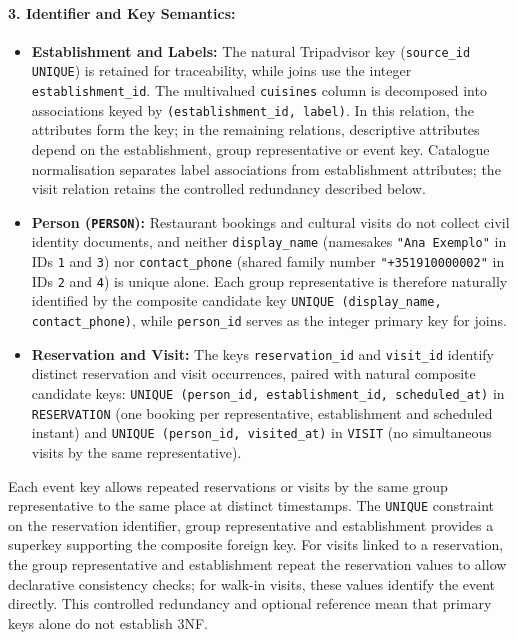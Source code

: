 \paragraph{3. Identifier and Key Semantics:}
\begin{itemize}\raggedright
\item \textbf{Establishment and Labels:} The natural Tripadvisor key (\texttt{source\_\allowbreak{}id UNIQUE}) is retained for traceability, while joins use the integer \texttt{establishment\_\allowbreak{}id}. The multivalued \texttt{cuisines} column is decomposed into associations keyed by \texttt{(\allowbreak{}establishment\_\allowbreak{}id,\allowbreak{} label)}. In this relation, the attributes form the key; in the remaining relations, descriptive attributes depend on the establishment, group representative or event key. Catalogue normalisation separates label associations from establishment attributes; the visit relation retains the controlled redundancy described below.
\item \textbf{Person (\texttt{PERSON}):} Restaurant bookings and cultural visits do not collect civil identity documents, and neither \texttt{display\_\allowbreak{}name} (namesakes \texttt{"Ana Exemplo"} in IDs \texttt{1} and \texttt{3}) nor \texttt{contact\_\allowbreak{}phone} (shared family number \texttt{"+351910000002"} in IDs \texttt{2} and \texttt{4}) is unique alone. Each group representative is therefore naturally identified by the composite candidate key \texttt{UNIQUE (\allowbreak{}display\_\allowbreak{}name,\allowbreak{} contact\_\allowbreak{}phone)}, while \texttt{person\_\allowbreak{}id} serves as the integer primary key for joins.
\item \textbf{Reservation and Visit:} The keys \texttt{reservation\_\allowbreak{}id} and \texttt{visit\_\allowbreak{}id} identify distinct reservation and visit occurrences, paired with natural composite candidate keys: \texttt{UNIQUE (\allowbreak{}person\_\allowbreak{}id,\allowbreak{} establishment\_\allowbreak{}id,\allowbreak{} scheduled\_\allowbreak{}at)} in \texttt{RESERVATION} (one booking per representative, establishment and scheduled instant) and \texttt{UNIQUE (\allowbreak{}person\_\allowbreak{}id,\allowbreak{} visited\_\allowbreak{}at)} in \texttt{VISIT} (no simultaneous visits by the same representative).
\end{itemize}
Each event key allows repeated reservations or visits by the same group representative to the same place at distinct timestamps. The \texttt{UNIQUE} constraint on the reservation identifier, group representative and establishment provides a superkey supporting the composite foreign key. For visits linked to a reservation, the group representative and establishment repeat the reservation values to allow declarative consistency checks; for walk-in visits, these values identify the event directly. This controlled redundancy and optional reference mean that primary keys alone do not establish 3NF.
